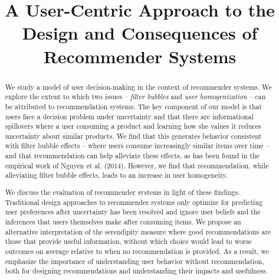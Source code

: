 \documentclass[sigconf]{acmart}
\begin{document}
\setlength{\abovedisplayskip}{0pt}
\setlength{\belowdisplayskip}{0pt}

%
\title{A User-Centric Approach to the Design and Consequences of Recommender Systems}
%

\makeatletter
\def\-copyrightspace{\relax}
\makeatother

%
\begin{abstract}
We study a model of user decision-making in the context of recommender systems. We explore the extent to which two issues -- \textit{filter bubbles} and \textit{user homogenization} -- can be attributed to recommendation systems. The key component of our model is that users face a decision problem under uncertainty and that there are informational spillovers where a user consuming a product and learning how she values it reduces uncertainty about similar products. We find that this generates behavior consistent with filter bubble effects -- where users consume increasingly similar items over time -- and that recommendation can help alleviate these effects, as has been found in the empirical work of Nguyen et al. (2014). However, we find that recommendation, while alleviating filter bubble effects, leads to an increase in user homogeneity.
\par
We discuss the evaluation of recommender systems in light of these findings. Traditional design approaches to recommender systems only optimize for predicting user preferences after uncertainty has been resolved and ignore user beliefs and the inferences that users themselves make after consuming items. We propose an alternative interpretation of the serendipity measure where good recommendations are those that provide useful information, without which choice would lead to worse outcomes on average relative to when no recommendation is provided. As a result, we emphasize the importance of understanding user behavior without recommendation, both for designing recommendations and understanding their impacts and usefulness.
\end{abstract}
\end{document}
